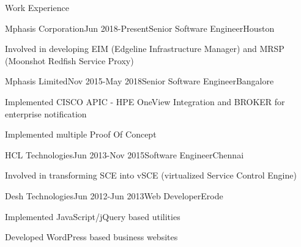 \documentclass{resume} %
\begin{document}
\begin{rSection}{ Work Experience } \itemsep -1pt        

\begin{rSubsection}{Mphasis Corporation}{Jun 2018-Present}{Senior Software Engineer}{Houston}    

\vspace{-3pt}

\item Involved in developing EIM (Edgeline Infrastructure Manager) and MRSP (Moonshot Redfish Service Proxy)
\end{rSubsection} 

\vspace{-4pt}


\begin{rSubsection}{Mphasis Limited}{Nov 2015-May 2018}{Senior Software Engineer}{Bangalore}    

\vspace{-3pt}

\item Implemented CISCO APIC - HPE OneView Integration and BROKER for enterprise notification
\item Implemented multiple Proof Of Concept
\end{rSubsection} 

\vspace{-4pt}


\begin{rSubsection}{HCL Technologies}{Jun 2013-Nov 2015}{Software Engineer}{Chennai}    

\vspace{-3pt}

\item Involved in transforming SCE into vSCE (virtualized Service Control Engine)

\end{rSubsection} 

\vspace{-4pt}


\begin{rSubsection}{Desh Technologies}{Jun 2012-Jun 2013}{Web Developer}{Erode}    

\vspace{-3pt}

\item Implemented JavaScript/jQuery based utilities 
\item Developed WordPress based business websites

\end{rSubsection} 

 
\end{rSection}
\end{document}

